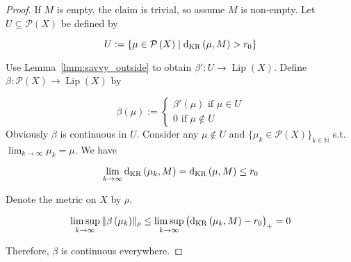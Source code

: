 \documentclass[11pt]{article}
\theoremstyle{definition}
\theoremstyle{plain}
\newcommand{\Nats}{\mathbb{N}}
\newcommand{\N}[1]{\lVert #1 \rVert}
\newcommand{\Sq}[2]{\{#1\}_{#2 \in \Nats}}
\newcommand{\PM}{\mathcal{P}}
\newcommand{\Lp}{{\operatorname{Lip}}}
\newcommand{\DKR}{\operatorname{d}_{\textnormal{KR}}}
\begin{document}
\begin{proof}

If $M$ is empty, the claim is trivial, so assume $M$ is non-empty. Let $U \subseteq \PM\left(X\right)$ be defined by

$$U:=\{\mu \in \PM\left(X\right) \mid \DKR\left(\mu, M\right) > r_0\}$$

Use Lemma~\ref{lmm:savvy_outside} to obtain $\beta': U \rightarrow \Lp\left(X\right)$. Define $\beta: \PM\left(X\right) \rightarrow \Lp\left(X\right)$ by

$$\beta\left(\mu\right):=\begin{cases}\beta'\left(\mu\right) \text{ if } \mu \in U\\0 \text { if } \mu \not\in U\end{cases}$$ 
Obviously $\beta$ is continuous in $U$. Consider any $\mu \not\in U$ and $\Sq{\mu_k \in \PM\left(X\right)}{k}$ s.t. $\lim_{k \rightarrow \infty} \mu_k = \mu$. We have 

$$\lim_{k \rightarrow \infty} \DKR\left(\mu_k,M\right) = \DKR\left(\mu, M\right) \leq r_0$$

Denote the metric on $X$ by $\rho$. 

$$\limsup_{k \rightarrow \infty}{\N{\beta\left(\mu_k\right)}_\rho} \leq \limsup_{k \rightarrow \infty}{\left(\DKR\left(\mu_k,M\right) - r_0\right)_+} = 0$$

Therefore, $\beta$ is continuous everywhere.
\end{proof}
\end{document}
